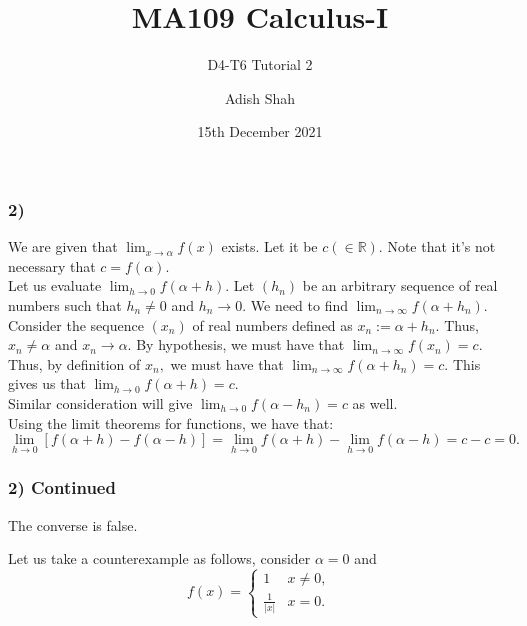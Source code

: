 \documentclass[handout]{beamer}
\title[MA109 Calculus-I] %
{MA109 Calculus-I}
\subtitle{D4-T6 Tutorial 2}
\author[Adish Shah] %
{Adish Shah}
\date[15th December 2021] %
{15th December 2021}
\begin{document}
\frame{\titlepage}

\begin{frame}
\frametitle{2)}
We are given that $\displaystyle\lim_{x\to \alpha}f(x)$ exists. Let it be $c (\in \mathbb{R}).$ Note that it's {\color[rgb]{1, 0, 0} not} necessary that $c = f(\alpha).$\\
	Let us evaluate $\displaystyle\lim_{h\to 0}f(\alpha + h).$ Let $(h_n)$ be an arbitrary sequence of real numbers such that $h_n \neq 0$ and $h_n \to 0.$ We need to find $\displaystyle\lim_{n\to \infty}f(\alpha + h_n).$\\
	Consider the sequence $(x_n)$ of real numbers defined as $x_n := \alpha + h_n.$ Thus, $x_n \neq \alpha$ and $x_n \to \alpha.$ By hypothesis, we must have that $\displaystyle\lim_{n\to \infty}f(x_n) = c.$\\
	Thus, by definition of $x_n,$ we must have that $\displaystyle\lim_{n\to \infty}f(\alpha + h_n) = c.$ This gives us that $\displaystyle\lim_{h\to 0}f(\alpha + h) = c.$\\
	Similar consideration will give $\displaystyle\lim_{h\to 0}f(\alpha - h_n) = c$ as well.\\
	Using the limit theorems for functions, we have that:
	\[\lim_{h\to 0}[f(\alpha + h) - f(\alpha - h)] = \lim_{h\to 0}f(\alpha+h) - \lim_{h\to 0}f(\alpha-h) = c - c = 0.\]
\end{frame}

\begin{frame}
\frametitle{2) Continued}
The converse is false.

Let us take a counterexample as follows, consider $\alpha = 0$ and
\begin{equation*} 
    f(x) = \begin{cases}
        1 & x \neq 0,\\
        \frac{1}{|x|} & x = 0.
    \end{cases}
\end{equation*}
    
\end{frame}

\end{document}
